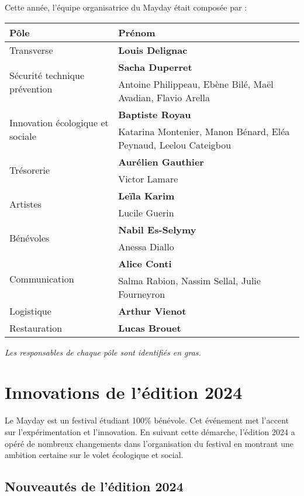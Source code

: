 \documentclass[12pt,a4paper]{report}
\begin{document}
Cette année, l'équipe organisatrice du Mayday était composée par :
\begin{center}
\begin{tabular}{| m{3cm} | m{10cm} |}
\hline
Pôle & Prénom \\ 
 \hline\hline
Transverse & \textbf{Louis Delignac}\\ 
\hline
\multirow{2}{10em}{Sécurité technique prévention} & \textbf{Sacha Duperret} \\ 
& Antoine Philippeau, Ebène Bilé, Maël Avadian, Flavio Arella\\ 
 \hline
 \multirow{2}{5em}{Innovation écologique et sociale} & \textbf{Baptiste Royau} \\ 
& Katarina Montenier, Manon Bénard, Eléa Peynaud, Leelou Cateigbou\\
 \hline
 \multirow{2}{5em}{Trésorerie} & \textbf{Aurélien Gauthier} \\ 
& Victor Lamare\\
 \hline
 \multirow{2}{5em}{Artistes} & \textbf{Leïla Karim} \\
& Lucile Guerin\\
 \hline
\multirow{2}{5em}{Bénévoles} & \textbf{Nabil Es-Selymy} \\ 
& Anessa Diallo\\
 \hline
\multirow{2}{7em}{Communication} & \textbf{Alice Conti} \\ 
& Salma Rabion, Nassim Sellal, Julie Fourneyron\\
 \hline
 \multirow{1}{5em}{Logistique} & \textbf{Arthur Vienot} \\ 
 \hline
 \multirow{1}{5em}{Restauration} & \textbf{Lucas Brouet} \\ 
 \hline
\end{tabular}
\end{center}

\textit{Les responsables de chaque pôle sont identifiés en gras.}

\chapter{Innovations de l'édition 2024}

Le Mayday est un festival étudiant 100\% bénévole. Cet événement met l’accent sur l’expérimentation et l’innovation. En suivant cette démarche, l’édition 2024 a opéré de nombreux changements dans l’organisation du festival en montrant une ambition certaine sur le volet écologique et social.

\section{Nouveautés de l'édition 2024}
\end{document}
